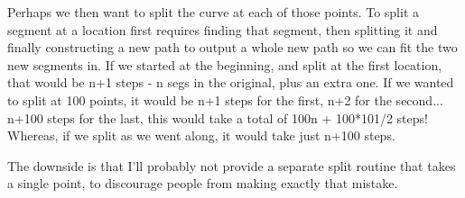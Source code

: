 \documentclass[openany]{book}
\begin{document}
Perhaps we then want to split the curve at each of those points.  To
split a segment at a location first requires finding that segment,
then splitting it and finally constructing a new path to output a whole
new path so we can fit the two new segments in.  If we started at the
beginning, and split at the first location, that would be n+1 steps - n
segs in the original, plus an extra one.  If we wanted to split at 100
points, it would be n+1 steps for the first, n+2 for the
second... n+100 steps for the last, this would take a total of 100n +
100*101/2 steps!  Whereas, if we split as we went along, it would take
just n+100 steps.

The downside is that I'll probably not provide a separate split
routine that takes a single point, to discourage people from making
exactly that mistake.
\end{document}
